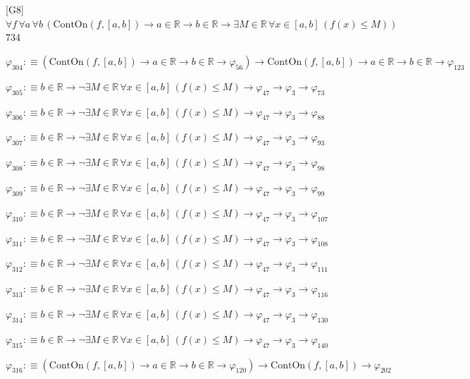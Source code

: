 \begin{fullproof}{[G8]}{$\forall f\,\forall a\,\forall b\,(\mathrm{ContOn}(f,[a,b]) \to a \in \mathbb{R} \to b \in \mathbb{R} \to \exists M \in \mathbb{R}\,\forall x \in [a,b]\,(f(x) \leq M))$}{734}
\begin{abbrevlist}
\item $\varphi_{304} :\equiv (\mathrm{ContOn}(f,[a,b]) \to a \in \mathbb{R} \to b \in \mathbb{R} \to \varphi_{56}) \to \mathrm{ContOn}(f,[a,b]) \to a \in \mathbb{R} \to b \in \mathbb{R} \to \varphi_{123}$
\item $\varphi_{305} :\equiv b \in \mathbb{R} \to \neg \exists M \in \mathbb{R}\,\forall x \in [a,b]\,(f(x) \leq M) \to \varphi_{47} \to \varphi_{3} \to \varphi_{73}$
\item $\varphi_{306} :\equiv b \in \mathbb{R} \to \neg \exists M \in \mathbb{R}\,\forall x \in [a,b]\,(f(x) \leq M) \to \varphi_{47} \to \varphi_{3} \to \varphi_{88}$
\item $\varphi_{307} :\equiv b \in \mathbb{R} \to \neg \exists M \in \mathbb{R}\,\forall x \in [a,b]\,(f(x) \leq M) \to \varphi_{47} \to \varphi_{3} \to \varphi_{93}$
\item $\varphi_{308} :\equiv b \in \mathbb{R} \to \neg \exists M \in \mathbb{R}\,\forall x \in [a,b]\,(f(x) \leq M) \to \varphi_{47} \to \varphi_{3} \to \varphi_{98}$
\item $\varphi_{309} :\equiv b \in \mathbb{R} \to \neg \exists M \in \mathbb{R}\,\forall x \in [a,b]\,(f(x) \leq M) \to \varphi_{47} \to \varphi_{3} \to \varphi_{99}$
\item $\varphi_{310} :\equiv b \in \mathbb{R} \to \neg \exists M \in \mathbb{R}\,\forall x \in [a,b]\,(f(x) \leq M) \to \varphi_{47} \to \varphi_{3} \to \varphi_{107}$
\item $\varphi_{311} :\equiv b \in \mathbb{R} \to \neg \exists M \in \mathbb{R}\,\forall x \in [a,b]\,(f(x) \leq M) \to \varphi_{47} \to \varphi_{3} \to \varphi_{108}$
\item $\varphi_{312} :\equiv b \in \mathbb{R} \to \neg \exists M \in \mathbb{R}\,\forall x \in [a,b]\,(f(x) \leq M) \to \varphi_{47} \to \varphi_{3} \to \varphi_{111}$
\item $\varphi_{313} :\equiv b \in \mathbb{R} \to \neg \exists M \in \mathbb{R}\,\forall x \in [a,b]\,(f(x) \leq M) \to \varphi_{47} \to \varphi_{3} \to \varphi_{116}$
\item $\varphi_{314} :\equiv b \in \mathbb{R} \to \neg \exists M \in \mathbb{R}\,\forall x \in [a,b]\,(f(x) \leq M) \to \varphi_{47} \to \varphi_{3} \to \varphi_{130}$
\item $\varphi_{315} :\equiv b \in \mathbb{R} \to \neg \exists M \in \mathbb{R}\,\forall x \in [a,b]\,(f(x) \leq M) \to \varphi_{47} \to \varphi_{3} \to \varphi_{140}$
\item $\varphi_{316} :\equiv (\mathrm{ContOn}(f,[a,b]) \to a \in \mathbb{R} \to b \in \mathbb{R} \to \varphi_{120}) \to \mathrm{ContOn}(f,[a,b]) \to \varphi_{202}$

\end{abbrevlist}
\end{fullproof}
